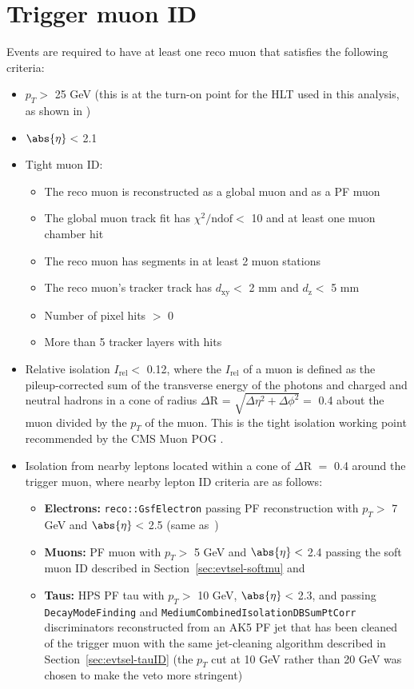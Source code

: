 \section{Trigger muon ID\label{sec:evtsel-triggermu}}

Events are required to have at least one reco muon that satisfies the following criteria:
\begin{itemize}
	\item $p_T >$ 25 GeV (this is at the turn-on point for the HLT used in this analysis, as shown in \cite{CMS:muonhlttwiki})
	\item $\abs{\eta} <$ 2.1
	\item Tight muon ID:
	\begin{itemize}
		\item The reco muon is reconstructed as a global muon and as a PF muon
		\item The global muon track fit has $\chi^{2}/\text{ndof} <$ 10 and at least one muon chamber hit 
		\item The reco muon has segments in at least 2 muon stations
		\item The reco muon's tracker track has $d_{\text{xy}} <$ 2 mm and $d_{\text{z}} <$ 5 mm
		\item Number of pixel hits $>$ 0
		\item More than 5 tracker layers with hits
	\end{itemize}
	\item Relative isolation $I_{\text{rel}} <$ 0.12, where the $I_{\text{rel}}$ of a muon is defined as the pileup-corrected sum of the transverse energy of the photons and charged and neutral hadrons in a cone of radius $\Delta$R = $\sqrt{\Delta\eta^{2} + \Delta\phi^{2}} =$ 0.4 about the muon divided by the $p_T$ of the muon. This is the tight isolation working point recommended by the CMS Muon POG \cite{CMS:muonidtwiki}.
        \item Isolation from nearby leptons located within a cone of $\Delta$R $=$ 0.4 around the trigger muon, where nearby lepton ID criteria are as follows:
          \begin{itemize}
          \item \textbf{Electrons:} \texttt{reco::GsfElectron} passing PF reconstruction with $p_T >$ 7 GeV and $\abs{\eta} <$ 2.5 (same as~\cite{Chatrchyan:2013mxa})
          \item \textbf{Muons:} PF muon with $p_T >$ 5 GeV and $\abs{\eta} <$ 2.4 passing the soft muon ID described in Section~\ref{sec:evtsel-softmu} and~\cite{CMS:2010uta}
          \item \textbf{Taus:} HPS PF tau with $p_T >$ 10 GeV, $\abs{\eta} <$ 2.3, and passing \texttt{DecayModeFinding} and \texttt{MediumCombinedIsolationDBSumPtCorr} discriminators reconstructed from an AK5 PF jet that has been cleaned of the trigger muon with the same jet-cleaning algorithm described in Section~\ref{sec:evtsel-tauID} (the $p_T$ cut at 10 GeV rather than 20 GeV was chosen to make the veto more stringent)
          \end{itemize}
\end{itemize}

